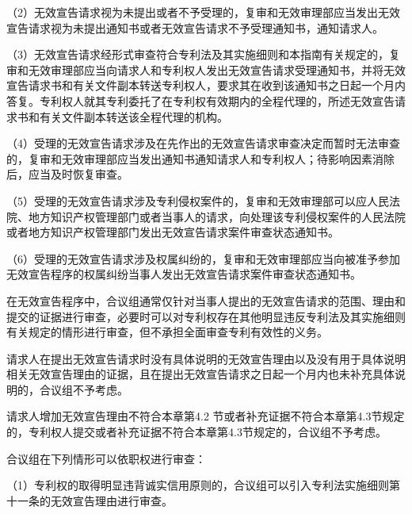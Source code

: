 {\setlength{\parindent}{17.1bp}（2）无效宣告请求视为未提出或者不予受理的，复审和无效审理部应当发出无效宣告请求视为未提出通知书或者无效宣告请求不予受理通知书，通知请求人。\par}

{\setlength{\parindent}{17.1bp}（3）无效宣告请求经形式审查符合专利法及其实施细则和本指南有关规定的，复审和无效审理部应当向请求人和专利权人发出无效宣告请求受理通知书，并将无效宣告请求书和有关文件副本转送专利权人，要求其在收到该通知书之日起一个月内答复。专利权人就其专利委托了在专利权有效期内的全程代理的，所述无效宣告请求书和有关文件副本转送该全程代理的机构。\par}

{\setlength{\parindent}{17.1bp}（4）受理的无效宣告请求涉及在先作出的无效宣告请求审查决定而暂时无法审查的，复审和无效审理部应当发出通知书通知请求人和专利权人；待影响因素消除后，应当及时恢复审查。\par}

{\setlength{\parindent}{17.1bp}（5）受理的无效宣告请求涉及专利侵权案件的，复审和无效审理部可以应人民法院、地方知识产权管理部门或者当事人的请求，向处理该专利侵权案件的人民法院或者地方知识产权管理部门发出无效宣告请求案件审查状态通知书。\par}

{\setlength{\parindent}{17.1bp}（6）受理的无效宣告请求涉及权属纠纷的，复审和无效审理部应当向被准予参加无效宣告程序的权属纠纷当事人发出无效宣告请求案件审查状态通知书。\par}

在无效宣告程序中，合议组通常仅针对当事人提出的无效宣告请求的范围、理由和提交的证据进行审查，必要时可以对专利权存在其他明显违反专利法及其实施细则有关规定的情形进行审查，但不承担全面审查专利有效性的义务。

请求人在提出无效宣告请求时没有具体说明的无效宣告理由以及没有用于具体说明相关无效宣告理由的证据，且在提出无效宣告请求之日起一个月内也未补充具体说明的，合议组不予考虑。

请求人增加无效宣告理由不符合本章第4.2 节或者补充证据不符合本章第4.3节规定的，专利权人提交或者补充证据不符合本章第4.3节规定的，合议组不予考虑。

合议组在下列情形可以依职权进行审查：

{\setlength{\parindent}{17.1bp}（1）专利权的取得明显违背诚实信用原则的，合议组可以引入专利法实施细则第十一条的无效宣告理由进行审查。\par}


